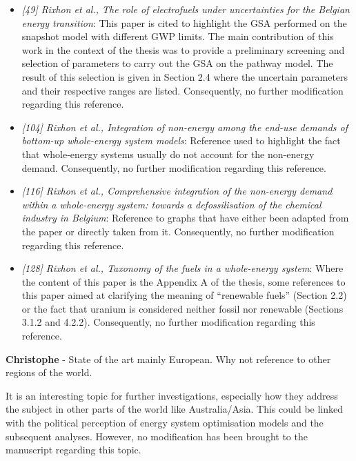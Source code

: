 \documentclass[12pt,a4paper]{article}
\begin{document}
\begin{itemize}
\item \emph{[49] Rixhon et al., The role of electrofuels under uncertainties for the Belgian energy transition}: This paper is cited to highlight the GSA performed on the snapshot model with different GWP limits. The main contribution of this work in the context of the thesis was to provide a preliminary screening and selection of parameters to carry out the GSA on the pathway model. The result of this selection is given in Section 2.4 where the uncertain parameters and their respective ranges are listed. Consequently, no further modification regarding this reference.
\item \emph{[104] Rixhon et al., Integration of non-energy among the end-use demands of bottom-up whole-energy system models}: Reference used to highlight the fact that whole-energy systems usually do not account for the non-energy demand. Consequently, no further modification regarding this reference.
\item \emph{[116] Rixhon et al., Comprehensive
integration of the non-energy demand within a whole-energy system: towards a defossilisation of the chemical industry in Belgium}: Reference to graphs that have either been adapted from the paper or directly taken from it. Consequently, no further modification regarding this reference.
\item \emph{[128] Rixhon et al., Taxonomy of the fuels in a whole-energy system}: Where the content of this paper is the Appendix A of the thesis, some references to this paper aimed at clarifying the meaning of ``renewable fuels'' (Section 2.2) or the fact that uranium is considered neither fossil nor renewable (Sections 3.1.2 and 4.2.2). Consequently, no further modification regarding this reference.
\end{itemize}



\begin{mdframed}[style=comment] %
{\color{violet} \textbf{Christophe}} - State of the art mainly European. Why not reference to other regions of the world.
\end{mdframed}

\noindent
It is an interesting topic for further investigations, especially how they address the subject in other parts of the world like Australia/Asia. This could be linked with the political perception of energy system optimisation models and the subsequent analyses. However, no modification has been brought to the manuscript regarding this topic.
\end{document}
